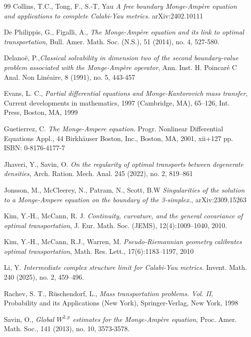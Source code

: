 \documentclass[12pt,reqno]{amsart}
\numberwithin{equation}{section}
\begin{document}
\begin{thebibliography}{99}
         Collins, T.C., Tong, F., S.-T, Yau {\em A free boundary Monge-Ampère equation and applications to complete Calabi-Yau metrics.} arXiv:2402.10111

         De Philippis, G., Figalli, A., {\em The {M}onge-{A}mp\`ere equation and its link to optimal transportation}, Bull. Amer. Math. Soc. (N.S.), 51 (2014), no. 4, 527-580. 

         Delano\"e, P.,{\em Classical solvability in dimension two of the second boundary-value problem associated with the {M}onge-{A}mp\`ere operator}, Ann. Inst. H. Poincar\'e{} C Anal. Non Lin\'eaire, 8 (1991), no. 5, 443-457

         Evans, L. C., {\em Partial differential equations and {M}onge-{K}antorovich mass transfer}, Current developments in mathematics, 1997 ({C}ambridge, {MA}), 65--126, Int. Press, Boston, MA, 1999
    

		 Guetierrez, C. {\em The Monge-Ampere equation. }Progr. Nonlinear Differential Equations Appl., 44 Birkhäuser Boston, Inc., Boston, MA, 2001, xii+127 pp. ISBN: 0-8176-4177-7
            
		 Jhaveri, Y., Savin, O. {\em On the regularity of optimal transports between degenerate densities}, Arch. Ration. Mech. Anal. 245 (2022), no. 2, 819--861

		Jonsson, M., McCleerey, N., Patram, N., Scott, B.W {\em Singularities of the solution to a Monge-Ampere equation on the boundary of the 3-simplex.}, arXiv:2309.15263
				
        Kim, Y.-H., McCann, R. J. {\em Continuity, curvature, and the general covariance of optimal transportation}, J. Eur. Math. Soc. (JEMS), 12(4):1009–1040, 2010.

        Kim, Y.-H., McCann, R.J., Warren, M. {\em  Pseudo-Riemannian geometry calibrates optimal transportation}, Math. Res. Lett., 17(6):1183–1197, 2010 

        Li, Y. {\em Intermediate complex structure limit for Calabi-Yau metrics.} Invent. Math. 240 (2025), no. 2, 459–496.

         Rachev, S. T., R\"uschendorf, L., {\em Mass transportation problems. {V}ol. {II}}, Probability and its Applications (New York), Springer-Verlag, New York, 1998

         Savin, O., {\em Global {$W^{2,p}$} estimates for the {M}onge-{A}mp\`ere equation}, Proc. Amer. Math. Soc., 141 (2013), no. 10, 3573-3578.


\end{thebibliography}
\end{document}
